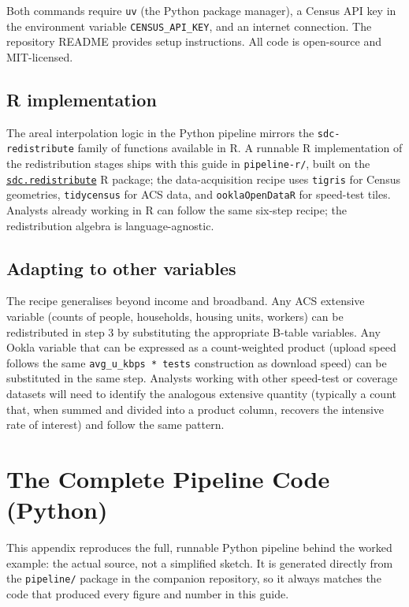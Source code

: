 \documentclass[
  letterpaper,
  DIV=11,
  numbers=noendperiod]{scrreprt}
\begin{document}
Both commands require \texttt{uv} (the Python package manager), a Census
API key in the environment variable \texttt{CENSUS\_API\_KEY}, and an
internet connection. The repository README provides setup instructions.
All code is open-source and MIT-licensed.

\section{R implementation}\label{r-implementation}

The areal interpolation logic in the Python pipeline mirrors the
\texttt{sdc-redistribute} family of functions available in R. A runnable
R implementation of the redistribution stages ships with this guide in
\texttt{pipeline-r/}, built on the
\href{https://github.com/dads2busy/sdc.redistribute}{\texttt{sdc.redistribute}}
R package; the data-acquisition recipe uses \texttt{tigris} for Census
geometries, \texttt{tidycensus} for ACS data, and
\texttt{ooklaOpenDataR} for speed-test tiles. Analysts already working
in R can follow the same six-step recipe; the redistribution algebra is
language-agnostic.

\section{Adapting to other variables}\label{adapting-to-other-variables}

The recipe generalises beyond income and broadband. Any ACS extensive
variable (counts of people, households, housing units, workers) can be
redistributed in step 3 by substituting the appropriate B-table
variables. Any Ookla variable that can be expressed as a count-weighted
product (upload speed follows the same \texttt{avg\_u\_kbps\ *\ tests}
construction as download speed) can be substituted in the same step.
Analysts working with other speed-test or coverage datasets will need to
identify the analogous extensive quantity (typically a count that, when
summed and divided into a product column, recovers the intensive rate of
interest) and follow the same pattern.


\chapter{The Complete Pipeline Code (Python)}\label{sec-code}

This appendix reproduces the full, runnable Python pipeline behind the
worked example: the actual source, not a simplified sketch. It is
generated directly from the \texttt{pipeline/} package in the companion
repository, so it always matches the code that produced every figure and
number in this guide.
\end{document}
